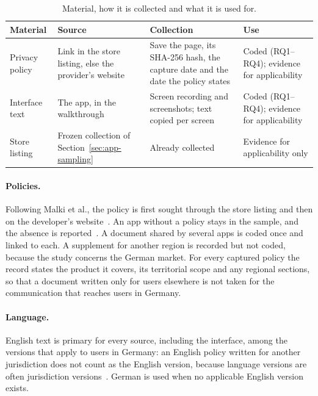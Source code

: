 \begin{table}[H]
\centering
\begin{singlespace}
\caption[Material, collection and use]{Material, how it is collected and what it is used for.}
\label{tab:material}
\footnotesize
\begin{tabularx}{\textwidth}{@{}>{\raggedright\arraybackslash}p{2.1cm}>{\raggedright\arraybackslash}p{2.4cm}>{\raggedright\arraybackslash}X>{\raggedright\arraybackslash}p{3.3cm}@{}}
\toprule
\textbf{Material} & \textbf{Source} & \textbf{Collection} & \textbf{Use} \\
\midrule
Privacy policy & Link in the store listing, else the provider's website
  & Save the page, its SHA-256 hash, the capture date and the date the policy states
  & Coded (RQ1--RQ4); evidence for applicability \\
\rowrule
Interface text & The app, in the walkthrough
  & Screen recording and screenshots; text copied per screen
  & Coded (RQ1--RQ4); evidence for applicability \\
\rowrule
Store listing & Frozen collection of Section~\ref{sec:app-sampling}
  & Already collected
  & Evidence for applicability only \\
\bottomrule
\end{tabularx}
\end{singlespace}
\end{table}

\paragraph{Policies.} Following Malki et al., the policy is first sought through the
store listing and then on the developer's website~\parencite[p.~5]{malki2024exploring}.
An app without a policy stays in the sample, and the absence is
reported~\parencite{sunyaev2015availability,robillard2019availability}. A document
shared by several apps is coded once and linked to each. A supplement for another
region is recorded but not coded, because the study concerns the German market. For every
captured policy the record states the product it covers, its territorial scope and any regional
sections, so that a document written only for users elsewhere is not taken for the
communication that reaches users in Germany.

\paragraph{Language.} English text is primary for every source, including the
interface, among the versions that apply to users in Germany: an English policy written for
another jurisdiction does not count as the English version, because language versions are often
jurisdiction versions~\parencite{arora2022tale,linden2020privacy}. German is used when no
applicable English version exists.

